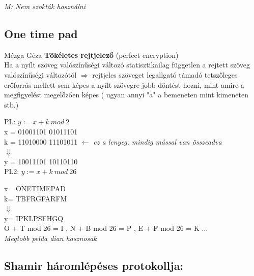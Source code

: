 	\small \textit{M: Nem szokták használni }\normalsize

\subsection{One time pad} %
	\begin{definicio}{Mézga Géza} \textbf{Tökéletes rejtjelező} \small (perfect encryption) \normalsize \\[2pt]
	Ha a nyílt szöveg valószínűségi változó statisztikailag független a rejtett szöveg valószínűségi változótól $\Longrightarrow$ rejtjeles szöveget legallgató támadó tetszőleges erőforrás mellett sem képes a nyílt szövegre jobb döntést hozni, mint amire a megfigyelést megelőzően képes ( ugyan annyi "a" a bemeneten mint kimeneten stb.)\\[2pt]
\end{definicio}

PL: $y := x + k \ mod\ 2$\\[2pt]
x = 01001101 01011101\\[2pt]
k = 11010000 11101011 \quad $\leftarrow$ \textit{ez a lenyeg, mindig mással van összeadva} \\[2pt]
	\forceindent \forceindent \forceindent	$\Downarrow$\\[2pt]
y = 10011101 10110110\\[2pt]

PL2: $y := x + k \ mod\ 26$

x= ONETIMEPAD \\[2pt]
k= TBFRGFARFM \\[2pt]
\forceindent \forceindent \forceindent	$\Downarrow$\\[2pt]
y= IPKLPSFHGQ \\[2pt]
O + T mod 26 = I , N + B mod 26 = P , E + F mod 26 = K $ \ldots$\\[2pt]
\small \textit{Megtobb pelda dian hasznosak} \normalsize

\subsection{Shamir háromlépéses protokollja:}

\subsection{}
